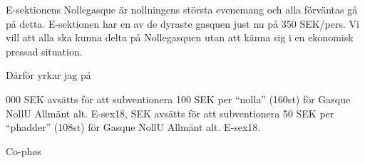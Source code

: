 \documentclass[../_main/handlingar.tex]{subfiles}
\begin{document}
E-sektionens Nollegasque är nollningens största evenemang och alla förväntas gå på detta. E-sektionen har en av de dyraste gasquen just nu på 350 SEK/pers. Vi vill att alla ska kunna delta på Nollegasquen utan att känna sig i en ekonomisk pressad situation. 

Därför yrkar jag på
\begin{attsatser}
     000 SEK avsätts för att subventionera 100 SEK per ``nolla'' (160st) för Gasque NollU Allmänt alt. E-sex18,
     SEK avsätts för att subventionera 50 SEK per ``phadder'' (108st) för Gasque NollU Allmänt alt. E-sex18.
\end{attsatser}


\begin{signatures}{1}
    \mvh
    \signature{Björn Fridqvist Nimvik}{Co-phøs}
\end{signatures}
\end{document}
